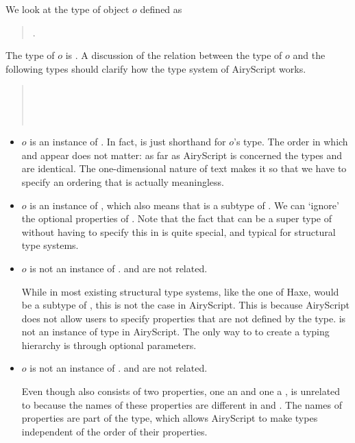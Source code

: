 We look at the type of object $o$ defined as
\begin{quote}
  .
\end{quote}
The type of $o$ is . A discussion of the relation between
the type of $o$ and the following types should clarify how the type system of
AiryScript works.
\begin{quote}
  \\
  \\
  \\
\end{quote}
\begin{itemize}
  \item $o$ is an instance of . In fact,  is just shorthand for
    $o$’s type. The order in which  and  appear does not matter:
    as far as AiryScript is concerned the types 
    and  are identical. The one-dimensional nature of text
    makes it so that we have to specify an ordering that is actually
    meaningless.

  \item $o$ is an instance of , which also means that  is a subtype
    of .  We can ‘ignore’ the optional properties of . Note that
    the fact that  can be a super type of  without having to specify
    this in  is quite special, and typical for structural type systems.

  \item $o$ is not an instance of .  and  are not related.
    
    While in most existing structural type systems, like the one of Haxe, 
    would be a subtype of , this is not the case in AiryScript. This is
    because AiryScript does not allow users to specify properties that are not
    defined by the type.  is not an instance of type  in AiryScript. The only way to to create a typing
    hierarchy is through optional parameters.

  \item $o$ is not an instance of .  and  are not related.
    
    Even though  also consists of two properties, one an  and one
    a ,  is unrelated to  because the names of these
    properties are different in  and . The names of properties are
    part of the type, which allows AiryScript to make types independent of the
    order of their properties.
\end{itemize}

